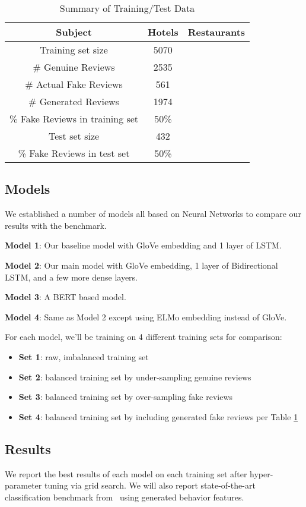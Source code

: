 \documentclass[conference]{IEEEtran} %
\theoremstyle{plain}
\theoremstyle{definition}
\begin{document}
\begin{table}[h]
\normalsize
\caption{Summary of Training/Test Data}
\centering
\begin{tabular}{|c|c|c|}
\hline
Subject & Hotels & Restaurants \\ \hline
Training set size & 5070 &  \\ \hline
\# Genuine Reviews & 2535  &  \\ \hline
\# Actual Fake Reviews & 561  &  \\ \hline
\# Generated Reviews & 1974 &  \\ \hline
\% Fake Reviews in training set & 50\% &  \\ \hline
Test set size & 432 &  \\ \hline
\% Fake Reviews in test set & 50\% &  \\ 
\hline
\end{tabular}
\label{trainining-data}

\end{table}

\subsection{Models}
We established a number of models all based on Neural Networks to compare our results with the benchmark.

\textbf{Model 1}: Our baseline model with GloVe embedding and 1 layer of LSTM.

\textbf{Model 2}: Our main model with GloVe embedding, 1 layer of Bidirectional LSTM, and a few more dense layers.

\textbf{Model 3}: A BERT based model.

\textbf{Model 4}: Same as Model 2 except using ELMo embedding instead of GloVe.


For each model, we'll be training on 4 different training sets for comparison:
\begin{itemize}
\setlength\itemsep{0em}
\item \textbf{Set 1}: raw, imbalanced training set
\item \textbf{Set 2}: balanced training set by under-sampling genuine reviews
\item \textbf{Set 3}: balanced training set by over-sampling fake reviews
\item \textbf{Set 4}: balanced training set by including generated fake reviews per Table \ref{trainining-data}
\end{itemize}

\subsection{Results}
We report the best results of each model on each training set after hyper-parameter tuning via grid search. We will also report state-of-the-art classification benchmark from~\cite{Tang2020} using generated behavior features.
\end{document}
